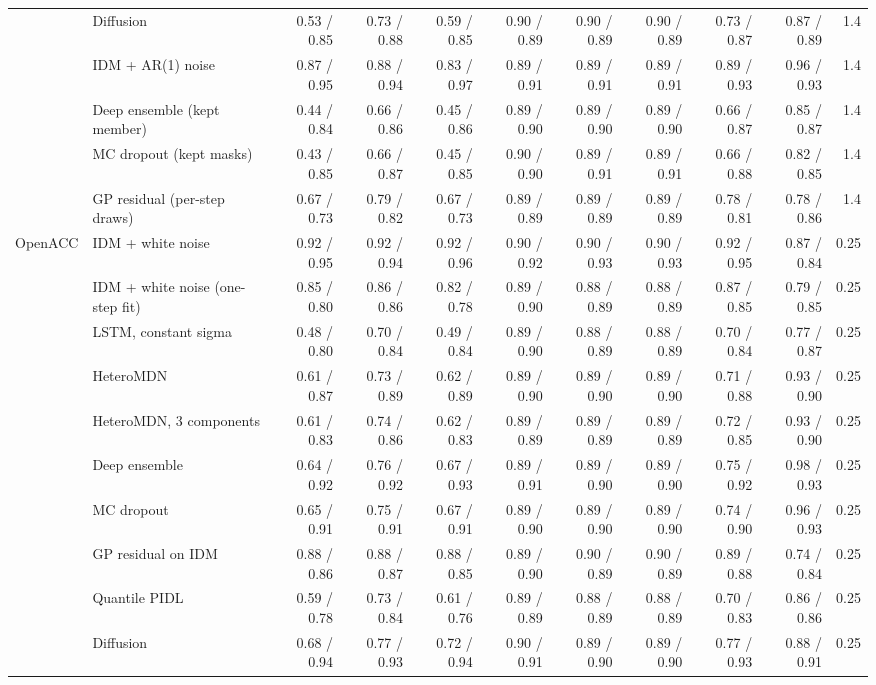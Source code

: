 \begin{longtable}{llrrrrrrrrr}
 & Diffusion & 0.53 / 0.85 & 0.73 / 0.88 & 0.59 / 0.85 & 0.90 / 0.89 & 0.90 / 0.89 & 0.90 / 0.89 & 0.73 / 0.87 & 0.87 / 0.89 & 1.4 \\
 & IDM + AR(1) noise & 0.87 / 0.95 & 0.88 / 0.94 & 0.83 / 0.97 & 0.89 / 0.91 & 0.89 / 0.91 & 0.89 / 0.91 & 0.89 / 0.93 & 0.96 / 0.93 & 1.4 \\
 & Deep ensemble (kept member) & 0.44 / 0.84 & 0.66 / 0.86 & 0.45 / 0.86 & 0.89 / 0.90 & 0.89 / 0.90 & 0.89 / 0.90 & 0.66 / 0.87 & 0.85 / 0.87 & 1.4 \\
 & MC dropout (kept masks) & 0.43 / 0.85 & 0.66 / 0.87 & 0.45 / 0.85 & 0.90 / 0.90 & 0.89 / 0.91 & 0.89 / 0.91 & 0.66 / 0.88 & 0.82 / 0.85 & 1.4 \\
 & GP residual (per-step draws) & 0.67 / 0.73 & 0.79 / 0.82 & 0.67 / 0.73 & 0.89 / 0.89 & 0.89 / 0.89 & 0.89 / 0.89 & 0.78 / 0.81 & 0.78 / 0.86 & 1.4 \\
\midrule
OpenACC & IDM + white noise & 0.92 / 0.95 & 0.92 / 0.94 & 0.92 / 0.96 & 0.90 / 0.92 & 0.90 / 0.93 & 0.90 / 0.93 & 0.92 / 0.95 & 0.87 / 0.84 & 0.25 \\
 & IDM + white noise (one-step fit) & 0.85 / 0.80 & 0.86 / 0.86 & 0.82 / 0.78 & 0.89 / 0.90 & 0.88 / 0.89 & 0.88 / 0.89 & 0.87 / 0.85 & 0.79 / 0.85 & 0.25 \\
 & LSTM, constant sigma & 0.48 / 0.80 & 0.70 / 0.84 & 0.49 / 0.84 & 0.89 / 0.90 & 0.88 / 0.89 & 0.88 / 0.89 & 0.70 / 0.84 & 0.77 / 0.87 & 0.25 \\
 & HeteroMDN & 0.61 / 0.87 & 0.73 / 0.89 & 0.62 / 0.89 & 0.89 / 0.90 & 0.89 / 0.90 & 0.89 / 0.90 & 0.71 / 0.88 & 0.93 / 0.90 & 0.25 \\
 & HeteroMDN, 3 components & 0.61 / 0.83 & 0.74 / 0.86 & 0.62 / 0.83 & 0.89 / 0.89 & 0.89 / 0.89 & 0.89 / 0.89 & 0.72 / 0.85 & 0.93 / 0.90 & 0.25 \\
 & Deep ensemble & 0.64 / 0.92 & 0.76 / 0.92 & 0.67 / 0.93 & 0.89 / 0.91 & 0.89 / 0.90 & 0.89 / 0.90 & 0.75 / 0.92 & 0.98 / 0.93 & 0.25 \\
 & MC dropout & 0.65 / 0.91 & 0.75 / 0.91 & 0.67 / 0.91 & 0.89 / 0.90 & 0.89 / 0.90 & 0.89 / 0.90 & 0.74 / 0.90 & 0.96 / 0.93 & 0.25 \\
 & GP residual on IDM & 0.88 / 0.86 & 0.88 / 0.87 & 0.88 / 0.85 & 0.89 / 0.90 & 0.90 / 0.89 & 0.90 / 0.89 & 0.89 / 0.88 & 0.74 / 0.84 & 0.25 \\
 & Quantile PIDL & 0.59 / 0.78 & 0.73 / 0.84 & 0.61 / 0.76 & 0.89 / 0.89 & 0.88 / 0.89 & 0.88 / 0.89 & 0.70 / 0.83 & 0.86 / 0.86 & 0.25 \\
 & Diffusion & 0.68 / 0.94 & 0.77 / 0.93 & 0.72 / 0.94 & 0.90 / 0.91 & 0.89 / 0.90 & 0.89 / 0.90 & 0.77 / 0.93 & 0.88 / 0.91 & 0.25 \\

\end{longtable}
